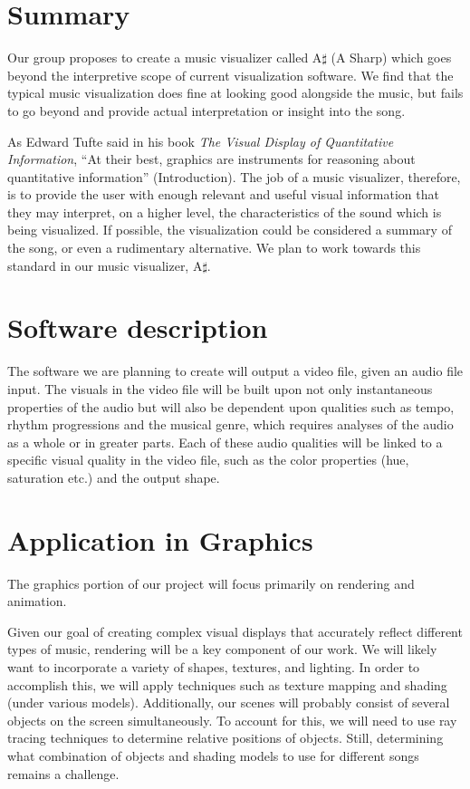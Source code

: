 \documentclass{article}
\begin{document}
\section{Summary}

Our group proposes to create a music visualizer called A$\sharp$ (A Sharp) which goes beyond the interpretive scope of current visualization software.  We find that the typical music visualization does fine at looking good alongside the music, but fails to go beyond and provide actual interpretation or insight into the song.

As Edward Tufte said in his book \textit{The Visual Display of Quantitative Information}, ``At their best, graphics are instruments for reasoning about quantitative information'' (Introduction).  The job of a music visualizer, therefore, is to provide the user with enough relevant and useful visual information that they may interpret, on a higher level, the characteristics of the sound which is being visualized.  If possible, the visualization could be considered a summary of the song, or even a rudimentary alternative.  We plan to work towards this standard in our music visualizer, A$\sharp$.

\section{Software description}

The software we are planning to create will output a video file, given an audio file input. The visuals in the video file will be built upon not only instantaneous properties of the audio but will also be dependent upon qualities such as tempo, rhythm progressions and the musical genre, which requires analyses of the audio as a whole or in greater parts. Each of these audio qualities will be linked to a specific visual quality in the video file, such as the color properties (hue, saturation etc.) and the output shape.

\section{Application in Graphics}

The graphics portion of our project will focus primarily on rendering and animation.
 
Given our goal of creating complex visual displays that accurately reflect different types of music, rendering will be a key component of our work. We will likely want to incorporate a variety of shapes, textures, and lighting. In order to accomplish this, we will apply techniques such as texture mapping and shading (under various models). Additionally, our scenes will probably consist of several objects on the screen simultaneously. To account for this, we will need to use ray tracing techniques to determine relative positions of objects. Still, determining what combination of objects and shading models to use for different songs remains a challenge.
 
\end{document}
